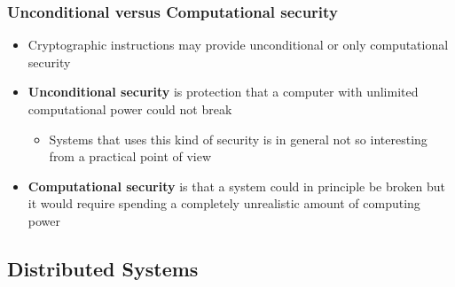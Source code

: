 \documentclass[11pt]{article}
\begin{document}
\subsubsection{Unconditional versus Computational security}
\label{sec:org4673bcb}
\begin{itemize}
\item Cryptographic instructions may provide unconditional or only computational security
\item \textbf{Unconditional security} is protection that a computer with unlimited computational power could not break
\begin{itemize}
\item Systems that uses this kind of security is in general not so interesting from a practical point of view
\end{itemize}
\item \textbf{Computational security} is that a system could in principle be broken but it would require spending a completely unrealistic amount of computing power
\end{itemize}
\subsection{Distributed Systems}
\label{sec:org7eb5b74}
\end{document}
